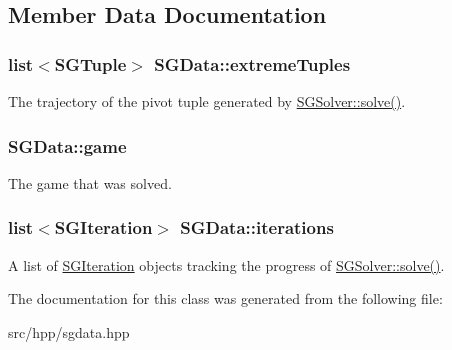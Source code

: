 \subsection{Member Data Documentation}
\hypertarget{classSGData_a197411a0804166fa2573a1de83046b49}{
\subsubsection[{extreme\-Tuples}]{\setlength{\rightskip}{0pt plus 5cm}list$<${\bf S\-G\-Tuple}$>$ S\-G\-Data\-::extreme\-Tuples}}\label{classSGData_a197411a0804166fa2573a1de83046b49}
The trajectory of the pivot tuple generated by \hyperlink{classSGSolver_a220dd431eabdd9ff8419fafb28b7b990}{S\-G\-Solver\-::solve()}. \hypertarget{classSGData_ac315814a5c4be6e272a192f3a7e0395c}{
\subsubsection[{game}]{ S\-G\-Data\-::game}}\label{classSGData_ac315814a5c4be6e272a192f3a7e0395c}
The game that was solved. \hypertarget{classSGData_a6361bae00b7e2dcf0c8c0d52ad330314}{
\subsubsection[{iterations}]{\setlength{\rightskip}{0pt plus 5cm}list$<${\bf S\-G\-Iteration}$>$ S\-G\-Data\-::iterations}}\label{classSGData_a6361bae00b7e2dcf0c8c0d52ad330314}
A list of \hyperlink{classSGIteration}{S\-G\-Iteration} objects tracking the progress of \hyperlink{classSGSolver_a220dd431eabdd9ff8419fafb28b7b990}{S\-G\-Solver\-::solve()}. 

The documentation for this class was generated from the following file\-:\begin{DoxyCompactItemize}
\item 
src/hpp/sgdata.\-hpp\end{DoxyCompactItemize}
